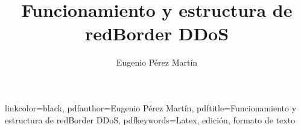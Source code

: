 \documentclass[11pt,twoside,notitlepage,twocolumn]{article}
\begin{document}



\newcommand{\thetitle}{Funcionamiento y estructura de redBorder DDoS}
\newcommand{\theautor}{Eugenio Pérez Martín}
\title{\thetitle} %
\author{\theautor}

\hypersetup
	{
 	linkcolor=black, %
	pdfauthor={\theautor},
	pdftitle={\thetitle}, 
	pdfkeywords={Latex, edición, formato de texto}	
	 }

\maketitle

 


%

%

%

%

%

%
%
% 
%
%
%

%
%
\end{document}
